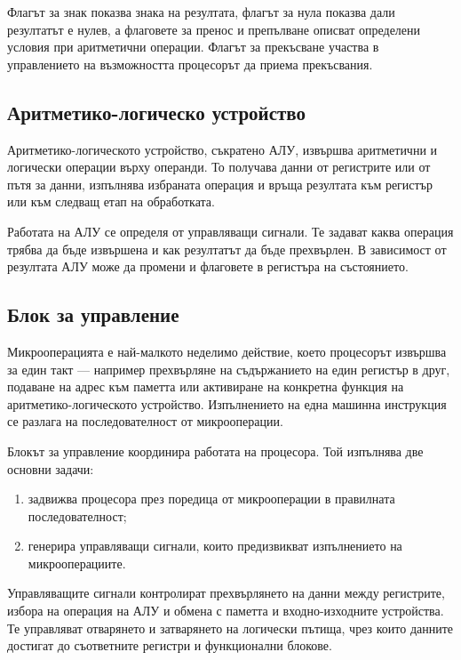Флагът за знак показва знака на резултата, флагът за нула показва дали резултатът е нулев, а флаговете за пренос и препълване описват определени условия при аритметични операции. Флагът за прекъсване участва в управлението на възможността процесорът да приема прекъсвания.

\subsection{Аритметико-логическо устройство}\label{s:9.3.2}

\begin{defn}
Аритметико-логическото устройство, съкратено АЛУ, извършва аритметични и логически операции върху операнди. То получава данни от регистрите или от пътя за данни, изпълнява избраната операция и връща резултата към регистър или към следващ етап на обработката.
\end{defn}

Работата на АЛУ се определя от управляващи сигнали. Те задават каква операция трябва да бъде извършена и как резултатът да бъде прехвърлен. В зависимост от резултата АЛУ може да промени и флаговете в регистъра на състоянието.

\subsection{Блок за управление}\label{s:9.3.3}

\begin{defn}[Микрооперация]
Микрооперацията е най-малкото неделимо действие, което процесорът извършва за един такт --- например прехвърляне на съдържанието на един регистър в друг, подаване на адрес към паметта или активиране на конкретна функция на аритметико-логическото устройство. Изпълнението на една машинна инструкция се разлага на последователност от микрооперации.
\end{defn}

Блокът за управление координира работата на процесора. Той изпълнява две основни задачи:

\begin{enumerate}
    \item задвижва процесора през поредица от микрооперации в правилната последователност;
    \item генерира управляващи сигнали, които предизвикват изпълнението на микрооперациите.
\end{enumerate}

Управляващите сигнали контролират прехвърлянето на данни между регистрите, избора на операция на АЛУ и обмена с паметта и входно-изходните устройства. Те управляват отварянето и затварянето на логически пътища, чрез които данните достигат до съответните регистри и функционални блокове.

